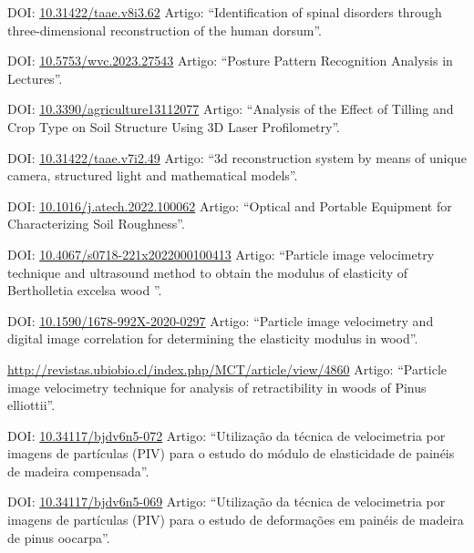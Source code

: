 \documentclass[11pt,a4paper,sans]{moderncv} %
\newcommand{\doiurl}[1]{\href{https://doi.org/#1}{#1}}
\begin{document}
	      {DOI: \doiurl{10.31422/taae.v8i3.62} }{}{}
	      {Artigo: ``Identification of spinal disorders through three-dimensional reconstruction of the human dorsum''.}
	      
	      {DOI: \doiurl{10.5753/wvc.2023.27543} }{}{}
	      {Artigo: ``Posture Pattern Recognition Analysis in Lectures''.}
	      
	      {DOI: \doiurl{10.3390/agriculture13112077} }{}{}
	      {Artigo: ``Analysis of the Effect of Tilling and Crop Type on Soil Structure Using 3D Laser Profilometry''.}
	      
	      {DOI: \doiurl{10.31422/taae.v7i2.49} }{}{}
	      {Artigo: ``3d reconstruction system by means of unique camera, structured light and mathematical models''.}

	      {DOI: \doiurl{10.1016/j.atech.2022.100062} }{}{}
	      {Artigo: ``Optical and Portable Equipment for Characterizing Soil Roughness''.}
	      
	      {DOI: \doiurl{10.4067/s0718-221x2022000100413} }{}{}
	      {Artigo: ``Particle image velocimetry technique and ultrasound method to obtain the modulus of elasticity of Bertholletia excelsa wood ''.}
	      
	      {DOI: \doiurl{10.1590/1678-992X-2020-0297} }{}{}
	      {Artigo: ``Particle image velocimetry and digital image correlation for determining the elasticity modulus in wood''.}
	      
	      {\url{http://revistas.ubiobio.cl/index.php/MCT/article/view/4860}}{}{}
	      {Artigo: ``Particle image velocimetry technique for analysis of retractibility in woods of Pinus elliottii''.}
	      
	      {DOI: \doiurl{10.34117/bjdv6n5-072}}{}{}
	      {Artigo: ``Utilização da técnica de velocimetria por imagens de partículas (PIV) para o estudo do módulo de elasticidade de painéis de madeira compensada''.}

	      {DOI: \doiurl{10.34117/bjdv6n5-069}}{}{}
	      {Artigo: ``Utilização da técnica de velocimetria por imagens de partículas (PIV) para o estudo de deformações em painéis de madeira de pinus oocarpa''.}
\end{document}
